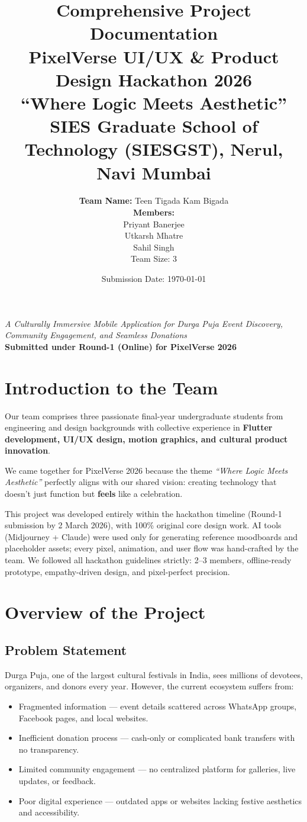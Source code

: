 \documentclass[11pt,a4paper]{article}
\title{\textbf{Comprehensive Project Documentation}\\[0.4em]
{\Large PixelVerse UI/UX \& Product Design Hackathon 2026}\\[0.2em]
{\large ``Where Logic Meets Aesthetic''}\\[0.3em]
SIES Graduate School of Technology (SIESGST), Nerul, Navi Mumbai}
\author{\textbf{Team Name:} Teen Tigada Kam Bigada \\[0.2em]
\textbf{Members:} \\
Priyant Banerjee \\
Utkarsh Mhatre \\
Sahil Singh \\[0.3em]
Team Size: 3 }
\date{Submission Date: \today }
\begin{document}
\maketitle
\thispagestyle{empty}

\vspace{1em}
\begin{center}
\textit{A Culturally Immersive Mobile Application for Durga Puja Event Discovery, Community Engagement, and Seamless Donations} \\
\textbf{Submitted under Round-1 (Online) for PixelVerse 2026}
\end{center}

\tableofcontents
\newpage

\section{Introduction to the Team}
Our team comprises three passionate final-year undergraduate students from engineering and design backgrounds with collective experience in \textbf{Flutter development, UI/UX design, motion graphics, and cultural product innovation}. 



We came together for PixelVerse 2026 because the theme \textit{``Where Logic Meets Aesthetic''} perfectly aligns with our shared vision: creating technology that doesn’t just function but \textbf{feels} like a celebration. 

This project was developed entirely within the hackathon timeline (Round-1 submission by 2 March 2026), with 100\% original core design work. AI tools (Midjourney + Claude) were used only for generating reference moodboards and placeholder assets; every pixel, animation, and user flow was hand-crafted by the team. We followed all hackathon guidelines strictly: 2–3 members, offline-ready prototype, empathy-driven design, and pixel-perfect precision.

\section{Overview of the Project}

\subsection{Problem Statement}
Durga Puja, one of the largest cultural festivals in India, sees millions of devotees, organizers, and donors every year. However, the current ecosystem suffers from:
\begin{itemize}
    \item Fragmented information — event details scattered across WhatsApp groups, Facebook pages, and local websites.
    \item Inefficient donation process — cash-only or complicated bank transfers with no transparency.
    \item Limited community engagement — no centralized platform for galleries, live updates, or feedback.
    \item Poor digital experience — outdated apps or websites lacking festive aesthetics and accessibility.
\end{itemize}
\end{document}
